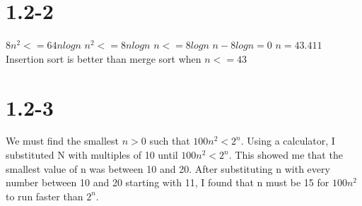 \documentclass[12pt]{article}
\begin{document}
\section{1.2-2}
$8n^2<=64nlogn$ \newline
$n^2<=8nlogn$ \newline
$n<=8logn$ \newline 
$n-8logn=0$ \newline
$n=43.411$ \newline
Insertion sort is better than merge sort when $n<=43$

\section{1.2-3}
We must find the smallest $n>0$ such that $100n^2<2^n$. Using a calculator, I substituted N with multiples of 10 until $100n^2<2^n$. This showed me that the smallest value of n was between 10 and 20. After substituting n with every number between 10 and 20 starting with 11, I found that n must be 15 for $100n^2$ to run faster than $2^n$.
\end{document}
